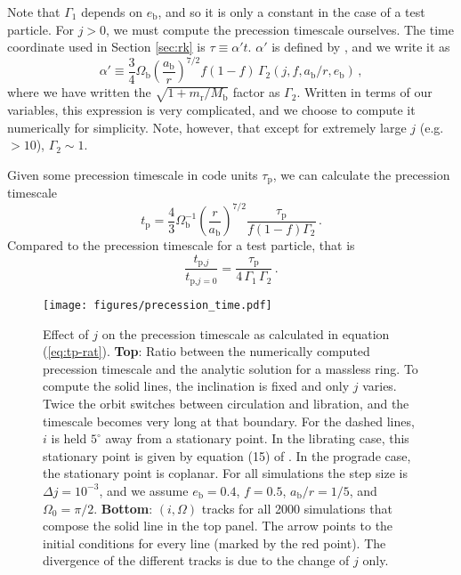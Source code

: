 \documentclass[twocolumn]{aastex631}
\begin{document}
Note that $\Gamma_1$ depends on $e_\text{b}$, and so it is only a constant in the case of a test particle. For $j>0$, we must compute the precession timescale ourselves. The time coordinate used in Section \ref{sec:rk} is $\tau \equiv \alpha' t$. $\alpha'$ is defined by \citet[see eq. 3.9]{farago2010}, and we write it as
\begin{equation}
    \alpha' \equiv \frac{3}{4} \Omega_\text{b} \left(\frac{a_\text{b}}{r}\right)^{7/2} f(1-f) \,\Gamma_2(j,f,a_\text{b}/r, e_\text{b}) \, ,
\end{equation}
where we have written the $\sqrt{1+m_\text{r}/M_\text{b}}$ factor as $\Gamma_2$. Written in terms of our variables, this expression is very complicated, and we choose to compute it numerically for simplicity. Note, however, that except for extremely large $j$ (e.g. $>10$), $\Gamma_2 \sim 1$.

Given some precession timescale in code units $\tau_\text{p}$, we can calculate the precession timescale
\begin{equation}
    \label{eq:tp-j}
    t_\text{p} = \frac{4}{3}\Omega_\text{b}^{-1} \left(\frac{r}{a_\text{b}}\right)^{7/2} \frac{\tau_\text{p}}{f(1-f)\Gamma_2}\, .
\end{equation}
Compared to the precession timescale for a test particle, that is
\begin{equation}
    \label{eq:tp-rat}
    \frac{t_{\text{p,}j}}{t_{\text{p,}j=0}} = \frac{\tau_\text{p}}{4\,\Gamma_1\,\Gamma_2} \, .
\end{equation}

\begin{figure}
    \texttt{[image: figures/precession\_time.pdf]}
    \caption{
        Effect of $j$ on the precession timescale as calculated in equation (\ref{eq:tp-rat}). {\bf Top}: Ratio between the numerically computed precession timescale and the analytic solution for a massless ring. To compute the solid lines, the inclination is fixed and only $j$ varies. Twice the orbit switches between circulation and libration, and the timescale becomes very long at that boundary. For the dashed lines, $i$ is held $5^\circ$ away from a stationary point. In the librating case, this stationary point is given by equation (15) of \citet{martin2019}. In the prograde case, the stationary point is coplanar. For all simulations the step size is $\Delta j = 10^{-3}$, and we assume $e_\text{b}=0.4$, $f=0.5$, $a_\text{b}/r = 1/5$, and $\Omega_0 = \pi/2$. {\bf Bottom}: $(i,\Omega)$ tracks for all 2000 simulations that compose the solid line in the top panel. The arrow points to the initial conditions for every line (marked by the red point). The divergence of the different tracks is due to the change of $j$ only.
    }
    \label{fig:t_p}
\end{figure}
\end{document}
